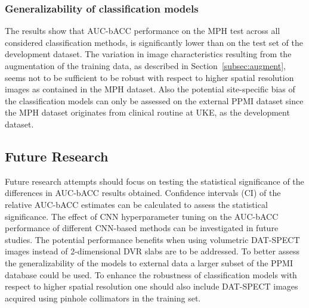 \subsubsection{Generalizability of classification models}

The results show that AUC-bACC performance on the MPH test across all considered classification methods, 
is significantly lower than on the test set of the development dataset.
The variation in image characteristics resulting from the augmentation of the training data,
as described in Section~\ref{subsec:augment}, seems not to be sufficient to be robust 
with respect to higher spatial resolution images as contained in the MPH dataset.
Also the potential site-specific bias of the classification models can only be assessed 
on the external PPMI dataset 
since the MPH dataset originates from clinical routine at UKE, as the development dataset.


\subsection{Future Research}

Future research attempts should focus on testing the statistical significance of 
the differences in AUC-bACC results obtained.
Confidence intervals (CI) of the relative AUC-bACC estimates can be calculated to assess the statistical significance.
The effect of CNN hyperparameter tuning on the AUC-bACC performance of different CNN-based methods 
can be investigated in future studies.
The potential performance benefits when using volumetric DAT-SPECT images instead of 2-dimensional DVR slabs 
are to be addressed.
To better assess the generalizability of the models to external data a larger subset of the PPMI database could be used.
To enhance the robustness of classification models with respect to higher spatial resolution 
one should also include DAT-SPECT images acquired using pinhole collimators in the training set.







